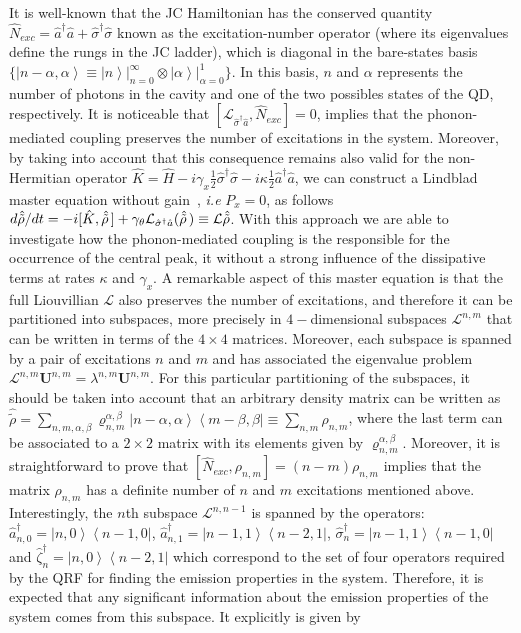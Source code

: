 \documentclass[aps,prl,showpacs,twocolumn]{revtex4}
\newcommand{\ket}[1]{\left| #1 \right>} %
\newcommand{\bra}[1]{\left< #1 \right|} %
\begin{document}
It is well-known that the JC Hamiltonian has the conserved quantity $\hat{N}_{exc}=\hat{a}^{\dagger}\hat{a}+\hat{\sigma}^{\dagger}\hat{\sigma}$ known as the excitation-number operator (where its eigenvalues define the rungs in the JC ladder), which is diagonal in the bare-states basis $\big\{\ket{n-\alpha,\alpha}\equiv\ket{n}\vert_{n=0}^{\infty}\otimes\ket{\alpha}\vert_{\alpha=0}^{1}\big\}$. In this basis, $n$ and $\alpha$ represents the number of photons in the cavity and one of the two possibles states of the QD, respectively. It is noticeable that $[\mathcal{L}_{\hat{\sigma}^{\dagger}\hat{a}},\hat{N}_{exc}]=0$, implies that the phonon-mediated coupling preserves the number of excitations in the system. Moreover, by taking into account that this consequence remains also valid for the non-Hermitian operator $\hat{K}=\hat{H}-i\gamma_{x}\frac{1}{2}\hat{\sigma}^{\dagger}\hat{\sigma}-i\kappa \frac{1}{2}\hat{a}^{\dagger}\hat{a}$, we can construct a Lindblad master equation without  gain~\cite{Torres:2014}, {\it i.e} $P_x=0$, as follows $d\hat{\tilde{\rho}}/dt=-i[\hat{K},\hat{\tilde{\rho}}\,]+\gamma_{\theta}\mathcal{L}_{\hat{\sigma}^{\dagger}\hat{a}}(\hat{\tilde{\rho}}\,)\equiv{\cal L}\hat{\tilde{\rho}}$. With this approach we are able to investigate how the phonon-mediated coupling is the responsible for the occurrence of the central peak, it without a strong influence of the dissipative terms at rates $\kappa$ and $\gamma_x$. A remarkable aspect of this master equation is that the full Liouvillian $\mathcal{L}$ also preserves the number of excitations, and therefore it can be partitioned into subspaces, more precisely in $4-$dimensional subspaces $\mathcal{L}^{n,m}$ that can be written in terms of the $4\times4$ matrices. Moreover, each subspace is spanned by a pair of excitations $n$ and $m$ and has associated the eigenvalue problem $\mathcal{L}^{n,m}{\mathbf U}^{n,m}=\lambda^{n,m}{\mathbf U}^{n,m}$. For this particular partitioning of the subspaces, it should be taken into account that an arbitrary density matrix can be written as $\hat{\tilde{\rho}}=\sum_{n,m,\alpha,\beta}\varrho_{n,m}^{\alpha,\beta}\ket{n-\alpha,\alpha}\bra{m-\beta,\beta}\equiv\sum_{n,m}\rho_{n,m}$, where the last term can be associated to a $2\times2$ matrix with its elements given by $\varrho_{n,m}^{\alpha,\beta}$. Moreover,  it is straightforward to prove that $[\hat{N}_{exc},\rho_{n,m}]=(n-m)\rho_{n,m}$ implies that the matrix $\rho_{n,m}$ has a definite number of $n$ and $m$ excitations mentioned above. Interestingly, the $n$th subspace $\mathcal{L}^{n,n-1}$ is spanned by the operators: $\hat{a}^{\dagger}_{n,0}=\ket{n,0}\bra{n-1,0}$, $\hat{a}^{\dagger}_{n,1}=\ket{n-1,1}\bra{n-2,1}$, $\hat{\sigma}^{\dagger}_{n}=\ket{n-1,1}\bra{n-1,0}$ and $\hat{\zeta}^{\dagger}_{n}=\ket{n,0}\bra{n-2,1}$ which correspond to the set of four operators required by the QRF for finding the emission properties in the system. Therefore, it is expected that any significant information about the emission properties of the system comes from this subspace. It explicitly is given by 
\end{document}
